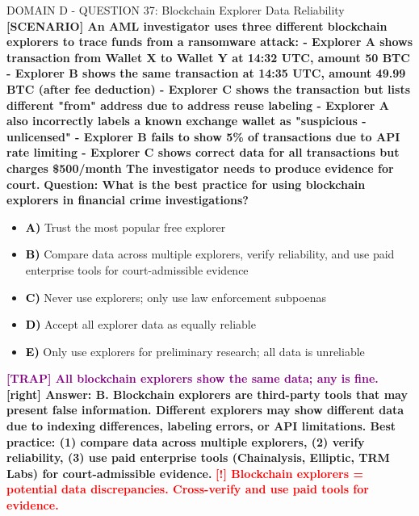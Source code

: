 \documentclass[11pt,a4paper]{beamer}
\newcommand{\redflag}[1]{\textcolor{red}{\textbf{[!] #1}}}
\newcommand{\trap}[1]{\textcolor{purple}{\textbf{[TRAP] #1}}}
\newcommand{\correct}[1]{\textcolor{green!50!black}{\textbf{[right] #1}}}
\newcommand{\scenario}[1]{\textcolor{blue!70!black}{\textbf{[SCENARIO] #1}}}
\newcommand{\option}[1]{\textcolor{black}{\textbf{#1}}}
\begin{document}
\begin{frame}{DOMAIN D - QUESTION 37: Blockchain Explorer Data Reliability}
\scenario{An AML investigator uses three different blockchain explorers to trace funds from a ransomware attack:
- Explorer A shows transaction from Wallet X to Wallet Y at 14:32 UTC, amount 50 BTC
- Explorer B shows the same transaction at 14:35 UTC, amount 49.99 BTC (after fee deduction)
- Explorer C shows the transaction but lists different "from" address due to address reuse labeling
- Explorer A also incorrectly labels a known exchange wallet as "suspicious - unlicensed"
- Explorer B fails to show 5\% of transactions due to API rate limiting
- Explorer C shows correct data for all transactions but charges \$500/month
The investigator needs to produce evidence for court.}
\vspace{0.2cm}
\textbf{Question: What is the best practice for using blockchain explorers in financial crime investigations?}
\vspace{0.1cm}
\begin{itemize}
    \item \option{A)} Trust the most popular free explorer
    \item \option{B)} Compare data across multiple explorers, verify reliability, and use paid enterprise tools for court-admissible evidence
    \item \option{C)} Never use explorers; only use law enforcement subpoenas
    \item \option{D)} Accept all explorer data as equally reliable
    \item \option{E)} Only use explorers for preliminary research; all data is unreliable
\end{itemize}
\vspace{0.2cm}
\trap{All blockchain explorers show the same data; any is fine.}
\correct{Answer: B. Blockchain explorers are third-party tools that may present false information. Different explorers may show different data due to indexing differences, labeling errors, or API limitations. Best practice: (1) compare data across multiple explorers, (2) verify reliability, (3) use paid enterprise tools (Chainalysis, Elliptic, TRM Labs) for court-admissible evidence.}
\redflag{Blockchain explorers = potential data discrepancies. Cross-verify and use paid tools for evidence.}
\end{frame}
\end{document}
